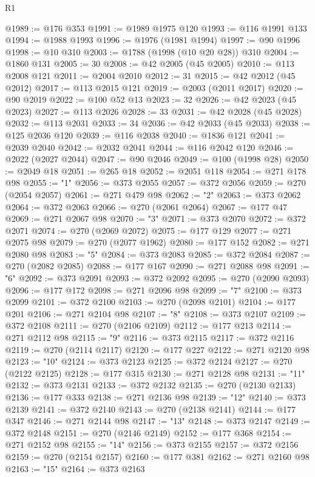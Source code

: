 \begin{lexlean}{R1}
\begin{coremodule}
@1989 := @176 @353
@1991 := @1989 @1975 @120
@1993 := @116 @1991 @133
@1994 := @1988 @1993
@1996 := @1976 (@1981 @1994)
@1997 := @90 @1996
@1998 := @10 @310
@2003 := @1788 (@1998 (@10 @20 @28)) @310
@2004 := @1860 @131
@2005 := 30
@2008 := @42 @2005 (@45 @2005)
@2010 := @113 @2008 @121
@2011 := @2004 @2010
@2012 := 31
@2015 := @42 @2012 (@45 @2012)
@2017 := @113 @2015 @121
@2019 := @2003 (@2011 @2017)
@2020 := @90 @2019
@2022 := @100 @52 @13
@2023 := 32
@2026 := @42 @2023 (@45 @2023)
@2027 := @113 @2026
@2028 := 33
@2031 := @42 @2028 (@45 @2028)
@2032 := @113 @2031
@2033 := 34
@2036 := @42 @2033 (@45 @2033)
@2038 := @125 @2036 @120
@2039 := @116 @2038
@2040 := @1836 @121
@2041 := @2039 @2040
@2042 := @2032 @2041
@2044 := @116 @2042 @120
@2046 := @2022 (@2027 @2044)
@2047 := @90 @2046
@2049 := @100 (@1998 @28)
@2050 := @2049 @18
@2051 := @265 @18
@2052 := @2051 @118
@2054 := @271 @178 @98
@2055 := "1"
@2056 := @373 @2055
@2057 := @372 @2056
@2059 := @270 (@2054 @2057)
@2061 := @271 @479 @98
@2062 := "2"
@2063 := @373 @2062
@2064 := @372 @2063
@2066 := @270 (@2061 @2064)
@2067 := @177 @47
@2069 := @271 @2067 @98
@2070 := "3"
@2071 := @373 @2070
@2072 := @372 @2071
@2074 := @270 (@2069 @2072)
@2075 := @177 @129
@2077 := @271 @2075 @98
@2079 := @270 (@2077 @1962)
@2080 := @177 @152
@2082 := @271 @2080 @98
@2083 := "5"
@2084 := @373 @2083
@2085 := @372 @2084
@2087 := @270 (@2082 @2085)
@2088 := @177 @167
@2090 := @271 @2088 @98
@2091 := "6"
@2092 := @373 @2091
@2093 := @372 @2092
@2095 := @270 (@2090 @2093)
@2096 := @177 @172
@2098 := @271 @2096 @98
@2099 := "7"
@2100 := @373 @2099
@2101 := @372 @2100
@2103 := @270 (@2098 @2101)
@2104 := @177 @201
@2106 := @271 @2104 @98
@2107 := "8"
@2108 := @373 @2107
@2109 := @372 @2108
@2111 := @270 (@2106 @2109)
@2112 := @177 @213
@2114 := @271 @2112 @98
@2115 := "9"
@2116 := @373 @2115
@2117 := @372 @2116
@2119 := @270 (@2114 @2117)
@2120 := @177 @227
@2122 := @271 @2120 @98
@2123 := "10"
@2124 := @373 @2123
@2125 := @372 @2124
@2127 := @270 (@2122 @2125)
@2128 := @177 @315
@2130 := @271 @2128 @98
@2131 := "11"
@2132 := @373 @2131
@2133 := @372 @2132
@2135 := @270 (@2130 @2133)
@2136 := @177 @333
@2138 := @271 @2136 @98
@2139 := "12"
@2140 := @373 @2139
@2141 := @372 @2140
@2143 := @270 (@2138 @2141)
@2144 := @177 @347
@2146 := @271 @2144 @98
@2147 := "13"
@2148 := @373 @2147
@2149 := @372 @2148
@2151 := @270 (@2146 @2149)
@2152 := @177 @368
@2154 := @271 @2152 @98
@2155 := "14"
@2156 := @373 @2155
@2157 := @372 @2156
@2159 := @270 (@2154 @2157)
@2160 := @177 @381
@2162 := @271 @2160 @98
@2163 := "15"
@2164 := @373 @2163

\end{coremodule}
\end{lexlean}
